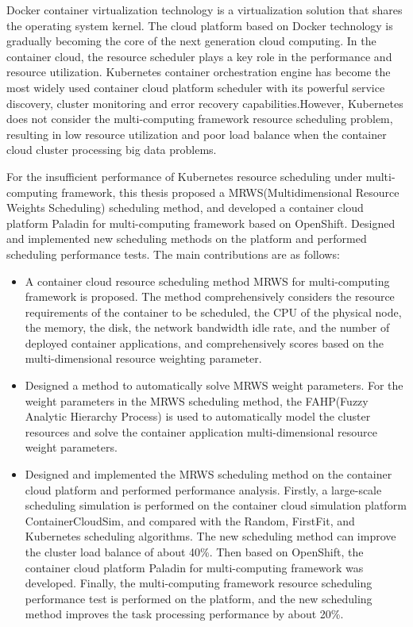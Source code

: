 \begin{eabstract}
Docker container virtualization technology is a virtualization solution that shares the operating system kernel. The cloud platform based on Docker technology is gradually becoming the core of the next generation cloud computing. In the container cloud, the resource scheduler plays a key role in the performance and resource utilization. Kubernetes container orchestration engine has become the most widely used container cloud platform scheduler with its powerful service discovery, cluster monitoring and error recovery capabilities.However, Kubernetes does not consider the multi-computing framework resource scheduling problem, resulting in low resource utilization and poor load balance when the container cloud cluster processing big data problems.

For the insufficient performance of Kubernetes resource scheduling under multi-computing framework, this thesis proposed a MRWS(Multidimensional Resource Weights Scheduling) scheduling method, and developed a container cloud platform Paladin for multi-computing framework based on OpenShift. Designed and implemented new scheduling methods on the platform and performed scheduling performance tests. The main contributions are as follows:

\begin{itemize}
	\item A container cloud resource scheduling method MRWS for multi-computing framework is proposed. The method comprehensively considers the resource requirements of the container to be scheduled, the CPU of the physical node, the memory, the disk, the network bandwidth idle rate, and the number of deployed container applications, and comprehensively scores based on the multi-dimensional resource weighting parameter.
	\item Designed a method to automatically solve MRWS weight parameters. For the weight parameters in the MRWS scheduling method, the FAHP(Fuzzy Analytic Hierarchy Process) is used to automatically model the cluster resources and solve the container application multi-dimensional resource weight parameters.
	\item Designed and implemented the MRWS scheduling method on the container cloud platform and performed performance analysis. Firstly, a large-scale scheduling simulation is performed on the container cloud simulation platform ContainerCloudSim, and compared with the Random, FirstFit, and Kubernetes scheduling algorithms. The new scheduling method can improve the cluster load balance of about 40\%. Then based on OpenShift, the container cloud platform Paladin for multi-computing framework was developed. Finally, the multi-computing framework resource scheduling performance test is performed on the platform, and the new scheduling method improves the task processing performance by about 20\%.
\end{itemize}
\end{eabstract}











